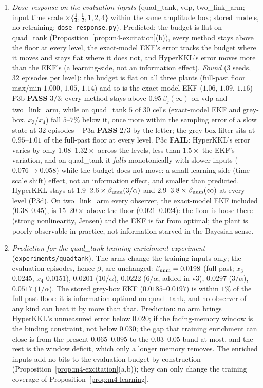 \begin{enumerate}
\item[(P3)] \emph{Dose--response on the evaluation inputs} (quad\_tank, vdp, two\_link\_arm; input time scale
$\times\{\tfrac14,\tfrac12,1,2,4\}$ within the same amplitude box; stored models, no retraining;
\texttt{dose\_response.py}). Predicted: the budget is flat on quad\_tank (Proposition~\ref{prop:m4-excitation}(b)),
every method stays above the floor at every level, the exact-model EKF's error tracks the budget where it moves
and stays flat where it does not, and HyperKKL's error moves more than the EKF's (a learning-side, not an
information effect). \emph{Found} ($3$ seeds, $32$ episodes per level): the budget is flat on all three plants
(full-past floor max/min $1.000$, $1.05$, $1.14$) and so is the exact-model EKF ($1.06$, $1.09$, $1.16$) -- P3b
\textbf{PASS} $3/3$; every method stays above $0.95\,\beta_j(\infty)$ on vdp and two\_link\_arm, while on quad\_tank
$5$ of $30$ cells (exact-model EKF and grey-box, $x_3$/$x_4$) fall $5$--$7\%$ below it, once more within the sampling
error of a slow state at $32$ episodes -- P3a \textbf{PASS} $2/3$ by the letter; the grey-box filter sits at
$0.95$--$1.01$ of the full-past floor at every level. P3c \textbf{FAIL}: HyperKKL's error varies by only
$1.08$--$1.32\times$ across the levels, less than $1.5\times$ the EKF's variation, and on quad\_tank it \emph{falls}
monotonically with slower inputs ($0.076\to0.058$) while the budget does not move: a small learning-side
(time-scale shift) effect, not an information effect, and smaller than predicted. HyperKKL stays at
$1.9$--$2.6\times\beta_{\rm unm}(3/\alpha)$ and $2.9$--$3.8\times\beta_{\rm unm}(\infty)$ at every level (P3d).
On two\_link\_arm every observer, the exact-model EKF included ($0.38$--$0.45$), is $15$--$20\times$ above the floor
($0.021$--$0.024$): the floor is loose there (strong nonlinearity, Jensen) and the EKF is far from optimal; the
plant is poorly observable in practice, not information-starved in the Bayesian sense.
\item[(P4)] \emph{Prediction for the quad\_tank training-enrichment experiment} (\texttt{experiments/quadtank}).
The arms change the training inputs only; the evaluation episodes, hence $\beta$, are unchanged:
$\beta_{\rm unm}=0.0198$ (full past; $x_3$ $0.0245$, $x_4$ $0.0151$), $0.0201$ ($10/\alpha$), $0.0222$ ($6/\alpha$, added in v3), $0.0297$ ($3/\alpha$),
$0.0517$ ($1/\alpha$). The stored grey-box EKF ($0.0185$--$0.0197$) is within $1\%$ of the full-past floor: it is
information-optimal on quad\_tank, and no observer of any kind can beat it by more than that. Prediction: no arm
brings HyperKKL's unmeasured error below $0.020$; if the fading-memory window is the binding constraint, not
below $0.030$; the gap that training enrichment can close is from the present $0.065$--$0.095$ to the
$0.03$--$0.05$ band at most, and the rest is the window deficit, which only a longer memory removes. The enriched
inputs add no bits to the evaluation budget by construction (Proposition~\ref{prop:m4-excitation}(a,b));
they can only change the training coverage of Proposition~\ref{prop:m4-learning}.
\end{enumerate}
